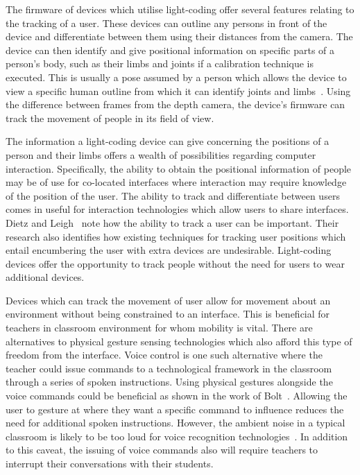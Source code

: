 \documentclass[link]{IWCOMP}
\begin{document}
The firmware of devices which utilise light-coding offer several features relating to the tracking of a user.
These devices can outline any persons in front of the device and differentiate between them using their distances from the camera.
The device can then identify and give positional information on specific parts of a person's body, such as their limbs and joints if a calibration technique is executed.
This is usually a pose assumed by a person which allows the device to view a specific human outline from which it can identify joints and limbs~\citep{Xia2011}.
Using the difference between frames from the depth camera, the device's firmware can track the movement of people in its field of view.

The information a light-coding device can give concerning the positions of a person and their limbs offers a wealth of possibilities regarding computer interaction.
Specifically, the ability to obtain the positional information of people may be of use for co-located interfaces where interaction may require knowledge of the position of the user.
The ability to track and differentiate between users comes in useful for interaction technologies which allow users to share interfaces.
Dietz and Leigh~\citeyearpar{Dietz2001} note how the ability to track a user can be important.
Their research also identifies how existing techniques for tracking user positions which entail encumbering the user with extra devices are undesirable.
Light-coding devices offer the opportunity to track people without the need for users to wear additional devices.

Devices which can track the movement of user allow for movement about an environment without being constrained to an interface.
This is beneficial for teachers in classroom environment for whom mobility is vital.
There are alternatives to physical gesture sensing technologies which also afford this type of freedom from the interface.
Voice control is one such alternative where the teacher could issue commands to a technological framework in the classroom through a series of spoken instructions.
Using physical gestures alongside the voice commands could be beneficial as shown in the work of Bolt~\citeyearpar{Bolt1980}.
Allowing the user to gesture at where they want a specific command to influence reduces the need for additional spoken instructions.
However, the ambient noise in a typical classroom is likely to be too loud for voice recognition technologies~\citep{Cavalier1996,Goette1998,OHare1999}.
In addition to this caveat, the issuing of voice commands also will require teachers to interrupt their conversations with their students.
\end{document}
